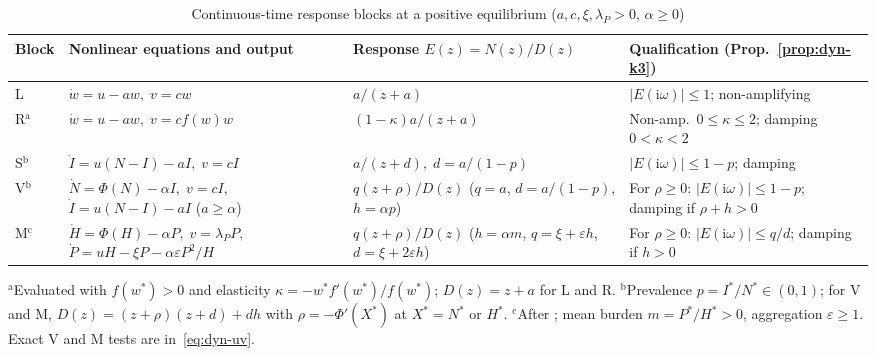 \begin{table}[ht]
\caption{Continuous-time response blocks at a positive equilibrium ($a, c, \xi, \lambda_P > 0$, $\alpha \ge 0$)}\label{tab:dyn-blocks}
\footnotesize
\begin{tabular*}{\textwidth}{@{\extracolsep\fill}lp{}p{}p{}@{}}
\toprule
Block & \raggedright Nonlinear equations and output & \raggedright Response $E(z) = N(z)/D(z)$ & \raggedright Qualification (Prop.~\ref{prop:dyn-k3}) \tabularnewline
\midrule
L & \raggedright $\dot{w} = u - aw,\; v = cw$ & \raggedright $a/(z + a)$ & \raggedright $|E(\mathrm{i}\omega)| \le 1$; non-amplifying \tabularnewline
R$^{\mathrm{a}}$ & \raggedright $\dot{w} = u - aw,\; v = cf(w)w$ & \raggedright $(1 - \kappa)a/(z + a)$ & \raggedright Non-amp.\ $0 \le \kappa \le 2$; damping $0 < \kappa < 2$ \tabularnewline
S$^{\mathrm{b}}$ & \raggedright $\dot{I} = u(N - I) - aI,\; v = cI$ & \raggedright $a/(z + d),\; d = a/(1 - p)$ & \raggedright $|E(\mathrm{i}\omega)| \le 1 - p$; damping \tabularnewline
V$^{\mathrm{b}}$ & \raggedright $\dot{N} = \Phi(N) - \alpha I,\; v = cI,$ $\dot{I} = u(N - I) - aI$ ($a \ge \alpha$) & \raggedright $q(z + \rho)/D(z)$ ($q = a$, $d = a/(1-p)$, $h = \alpha p$) & \raggedright For $\rho \ge 0$: $|E(\mathrm{i}\omega)| \le 1 - p$; damping if $\rho + h > 0$ \tabularnewline
M$^{\mathrm{c}}$ & \raggedright $\dot{H} = \Phi(H) - \alpha P,\; v = \lambda_P P,$ $\dot{P} = uH - \xi P - \alpha\varepsilon P^2/H$ & \raggedright $q(z + \rho)/D(z)$ ($h = \alpha m$, $q = \xi + \varepsilon h$, $d = \xi + 2\varepsilon h$) & \raggedright For $\rho \ge 0$: $|E(\mathrm{i}\omega)| \le q/d$; damping if $h > 0$ \tabularnewline
\bottomrule
\end{tabular*}
\par\smallskip\noindent\footnotesize
$^{\mathrm{a}}$Evaluated with $f(w^*) > 0$ and elasticity $\kappa = -w^* f'(w^*)/f(w^*)$; $D(z) = z + a$ for L and R.
$^{\mathrm{b}}$Prevalence $p = I^*/N^* \in (0, 1)$; for V and M, $D(z) = (z + \rho)(z + d) + dh$ with $\rho = -\Phi'(X^*)$ at $X^* = N^*$ or $H^*$.
$^{\mathrm{c}}$After \citet{anderson1978}; mean burden $m = P^*/H^* > 0$, aggregation $\varepsilon \ge 1$. Exact V and M tests are in~\eqref{eq:dyn-uv}.
\end{table}

